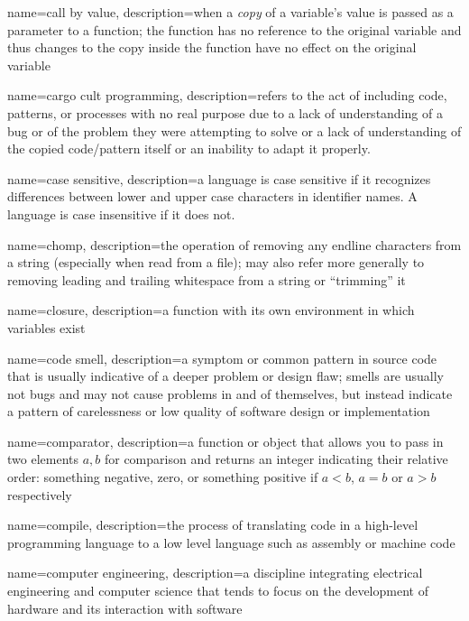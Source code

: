 {
  name=call by value,
  description={when a \emph{copy} of a variable's value is passed as a parameter to a function; the function has no reference to the original variable and thus changes to the copy inside the function have no effect on the original variable}
}

{
  name=cargo cult programming,
  description={refers to the act of including code, patterns, or processes with no real purpose due to a lack of understanding of a bug or of the problem they were attempting to solve or a lack of understanding of the copied code/pattern itself or an inability to adapt it properly.}
}

{
  name=case sensitive,
  description={a language is case sensitive if it recognizes differences between lower and upper case characters in 
  	identifier names.  A language is case insensitive if it does not.}
}

{
  name=chomp,
  description={the operation of removing any endline characters from a string (especially when read from a file); may also refer more generally to removing leading and trailing whitespace from a string or ``trimming'' it}
}

{
  name=closure,
  description={a function with its own environment in which variables exist}
}

{
  name=code smell,
  description={a symptom or common pattern in source code that is usually indicative of a deeper problem or design flaw; smells are usually not bugs and may not cause problems in and of themselves, but instead indicate a pattern of carelessness or low quality of software design or implementation}
}

{
  name=comparator,
  description={a function or object that allows you to pass in two elements $a, b$ for comparison and returns an integer indicating their relative order: something negative, zero, or something positive if $a < b$, $a = b$ or $a > b$ respectively}
}

{
  name=compile,
  description={the process of translating code in a high-level programming language to a low level language such as assembly or machine code}
}

{
  name=computer engineering,
  description={a discipline integrating electrical engineering and computer science that tends to focus on the development of hardware and its interaction with software}
}

